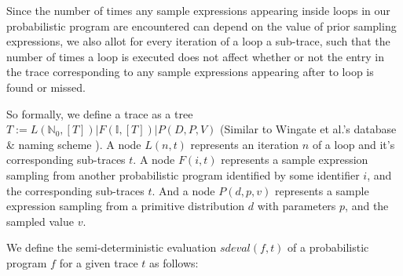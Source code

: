 Since the number of times any sample expressions appearing inside loops in our probabilistic program are encountered can depend on the value of prior sampling expressions, we also allot for every iteration of a loop a sub-trace, such that the number of times a loop is executed does not affect whether or not the entry in the trace corresponding to any sample expressions appearing after to loop is found or missed.

So formally, we define a trace as a tree $T := L(\mathbb{N}_0, [T]) | F(\mathbb{I}, [T]) | P(D,P,V)$ (Similar to Wingate et al.'s database \& naming scheme \cite{wingate2011lightweight}). A node $L(n,t)$ represents an iteration $n$ of a loop and it's corresponding sub-traces $t$. A node $F(i, t)$ represents a sample expression sampling from another probabilistic program identified by some identifier $i$, and the corresponding sub-traces $t$. And a node $P(d,p,v)$ represents a sample expression sampling from a primitive distribution $d$ with parameters $p$, and the sampled value $v$.

We define the semi-deterministic evaluation $sdeval(f,t)$ of a probabilistic program $f$ for a given trace $t$ as follows:

